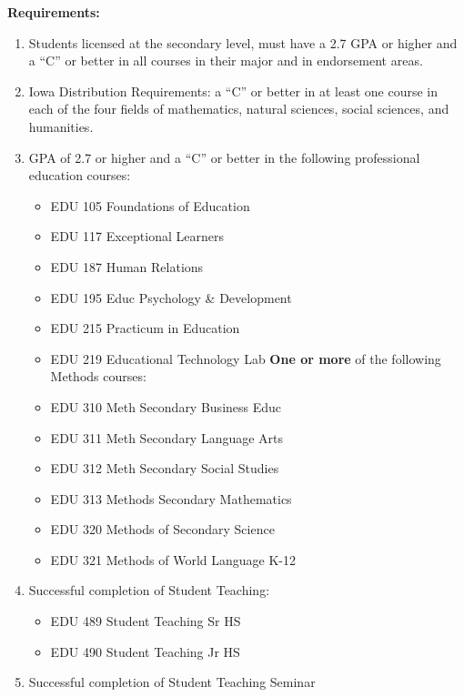 \documentclass[
  letterpaper,
]{scrbook}
\providecommand{\tightlist}{%
  \setlength{\itemsep}{0pt}\setlength{\parskip}{0pt}}
\begin{document}
\textbf{Requirements:}

\begin{enumerate}
\def\labelenumi{\arabic{enumi}.}
\tightlist
\item
  Students licensed at the secondary level, must have a 2.7 GPA or
  higher and a ``C'' or better in all courses in their major and in
  endorsement areas.
\item
  Iowa Distribution Requirements: a ``C'' or better in at least one
  course in each of the four fields of mathematics, natural sciences,
  social sciences, and humanities.
\item
  GPA of 2.7 or higher and a ``C'' or better in the following
  professional education courses:

  \begin{itemize}
  \tightlist
  \item
    EDU 105 Foundations of Education
  \item
    EDU 117 Exceptional Learners
  \item
    EDU 187 Human Relations
  \item
    EDU 195 Educ Psychology \& Development
  \item
    EDU 215 Practicum in Education
  \item
    EDU 219 Educational Technology Lab \textbf{One or more} of the
    following Methods courses:
  \item
    EDU 310 Meth Secondary Business Educ
  \item
    EDU 311 Meth Secondary Language Arts
  \item
    EDU 312 Meth Secondary Social Studies
  \item
    EDU 313 Methods Secondary Mathematics
  \item
    EDU 320 Methods of Secondary Science
  \item
    EDU 321 Methods of World Language K-12
  \end{itemize}
\item
  Successful completion of Student Teaching:

  \begin{itemize}
  \tightlist
  \item
    EDU 489 Student Teaching Sr HS
  \item
    EDU 490 Student Teaching Jr HS
  \end{itemize}
\item
  Successful completion of Student Teaching Seminar


\end{enumerate}
\end{document}
